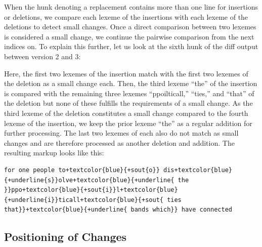 When the hunk denoting a replacement contains more than one line for insertions or deletions, we compare each lexeme of the insertions with each lexeme of the deletions to detect small changes.  Once a direct comparison between two lexemes is considered a small change, we continue the pairwise comparison from the next indices on.  To explain this further, let us look at the sixth hunk of the diff output between version 2 and 3:


Here, the first two lexemes of the insertion match with the first two lexemes of the deletion as a small change each.  Then, the third lexeme ``the'' of the insertion is compared with the remaining three lexemes ``ppoilticall,'' ``ties,'' and ``that'' of the deletion but none of these fulfills the requirements of a small change.  As the third lexeme of the deletion constitutes a small change compared to the fourth lexeme of the insertion, we keep the prior lexeme ``the'' as a regular addition for further processing.  The last two lexemes of each also do not match as small changes and are therefore processed as another deletion and addition.  The resulting markup looks like this:

\begin{Verbatim}[frame=lines,label={Markup of a more complicated replacement},samepage=true,showspaces=true,commandchars=+\{\}]
for one people to+textcolor{blue}{+sout{o}} dis+textcolor{blue}{+underline{s}}olve+textcolor{blue}{+underline{ the }}ppo+textcolor{blue}{+sout{i}}l+textcolor{blue}{+underline{i}}ticall+textcolor{blue}{+sout{ ties that}}+textcolor{blue}{+underline{ bands which}} have connected
\end{Verbatim}

\subsection{Positioning of Changes}\label{sec:change-pos}


